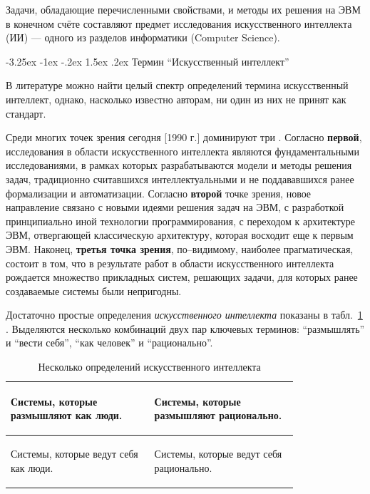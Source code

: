 \documentclass[12pt, openany, twoside]{book} %
\makeatletter
\renewcommand\section{\@startsection {section}{1}{\z@}%
                                   {-3.25ex \@plus -1ex \@minus -.2ex}%
                                   {1.5ex \@plus.2ex}%
                                   {\normalfont\large\bfseries}}
\makeatother
\begin{document}
Задачи,  обладающие перечисленными свойствами, и методы их решения на ЭВМ в конечном счёте составляют предмет исследования искусственного интеллекта (ИИ) --- одного из разделов информатики (Computer Science).

\section{Термин ``Искусственный интеллект''}

В литературе можно найти целый спектр определений термина искусственный интеллект, однако, насколько известно авторам, ни один из них не принят как стандарт.

Среди многих точек зрения сегодня [1990 г.] доминируют три \cite{AIDictionary}. Согласно {\bf первой}, исследования в области искусственного интеллекта являются фундаментальными исследованиями, в рамках которых разрабатываются модели и методы решения задач, традиционно считавшихся интеллектуальными и не поддававшихся ранее формализации и автоматизации. Согласно {\bf второй} точке зрения, новое направление связано с новыми идеями решения задач на ЭВМ, с разработкой принципиально иной технологии программирования, с переходом к архитектуре ЭВМ, отвергающей классическую архитектуру, которая восходит еще к первым ЭВМ. Наконец, {\bf третья точка зрения}, по--видимому, наиболее прагматическая, состоит в том, что в результате работ в области искусственного интеллекта рождается множество прикладных систем, решающих задачи, для которых ранее создаваемые системы были непригодны.

Достаточно простые определения {\em искусственного интеллекта} показаны в табл.~\ref{pic:determai} \cite{Russell}. Выделяются несколько комбинаций двух пар ключевых терминов: ``размышлять'' и ``вести себя'', ``как человек'' и ``рационально''.

\begin{table}[h]
\caption{Несколько определений искусственного интеллекта} \label{pic:determai}
\begin{center}
\begin{tabular}{|p{0.4\linewidth}|p{0.4\linewidth}|}
 \hline
 \begin{raggedright}
   Системы, которые размышляют как люди.
 \end{raggedright}
 &
 \begin{raggedright}
   Системы, которые размышляют рационально.
 \end{raggedright}
 \\\hline
 \begin{raggedright}
   Системы, которые ведут себя как
   люди.
 \end{raggedright}
 &
 \begin{raggedright}
   Системы, которые ведут себя рационально.
 \end{raggedright}
   \\\hline
\end{tabular}
\end{center}
\end{table}
\end{document}
